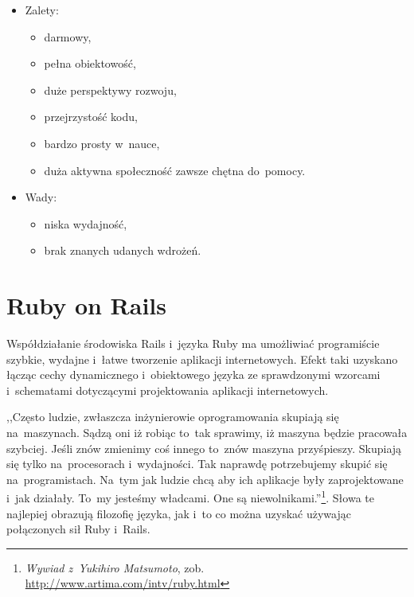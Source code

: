 \documentclass[a4paper,12pt,oneside]{report}
\begin{document}
\begin{itemize}
\item Zalety:
  \begin{itemize}
  \item darmowy,
  \item pełna obiektowość,
  \item duże perspektywy rozwoju, 
  \item przejrzystość kodu, 
  \item bardzo prosty w~nauce,
  \item duża aktywna społeczność zawsze chętna do~pomocy.
  \end{itemize}
\item Wady:
  \begin{itemize}
  \item niska wydajność,
  \item brak znanych udanych wdrożeń.
  \end{itemize}
\end{itemize}

\section{Ruby on Rails}
\label{sec:ror}

Współdziałanie środowiska Rails i~języka Ruby ma umożliwiać programiście szybkie, wydajne i~łatwe tworzenie aplikacji internetowych. Efekt taki uzyskano łącząc cechy dynamicznego i~obiektowego języka ze sprawdzonymi wzorcami i~schematami dotyczącymi projektowania aplikacji internetowych.

,,Często ludzie, zwłaszcza inżynierowie oprogramowania skupiają się na~maszynach. Sądzą oni iż robiąc to~tak sprawimy, iż maszyna będzie pracowała szybciej. Jeśli znów zmienimy coś innego to~znów maszyna przyśpieszy. Skupiają się tylko na~procesorach i~wydajności. Tak naprawdę potrzebujemy skupić się na~programistach. Na~tym jak ludzie chcą aby ich aplikacje były zaprojektowane i~jak działały. To~my jesteśmy władcami. One są niewolnikami.”\footnote{\emph{Wywiad z~Yukihiro Matsumoto}, zob. \url{http://www.artima.com/intv/ruby.html}}. Słowa te najlepiej obrazują filozofię języka, jak i~to co można uzyskać używając połączonych sił Ruby i~Rails. 
\end{document}
